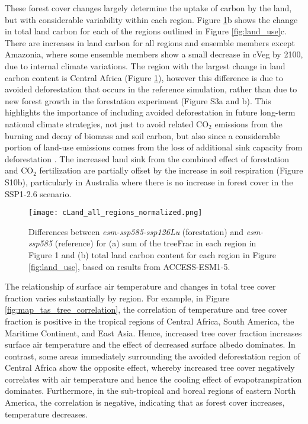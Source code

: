 \documentclass[draft]{agujournal2019}
\begin{document}
These forest cover changes largely determine the uptake of carbon by the land, but with considerable variability within each region.
Figure \ref{fig:accesss_regional_cland}b shows the change in total land carbon for each of the regions outlined in Figure \ref{fig:land_use}c.
There are increases in land carbon for all regions and ensemble members except Amazonia, where some ensemble members show a small decrease in cVeg by 2100, due to internal climate variations.
The region with the largest change in land carbon content is Central Africa (Figure \ref{fig:accesss_regional_cland}), however this difference is due to avoided deforestation that occurs in the reference simulation, rather than due to new forest growth in the forestation experiment (Figure S3a and b).
This highlights the importance of including avoided deforestation in future long-term national climate strategies, not just to avoid related CO$_2$ emissions from the burning and decay of biomass and soil carbon, but also since a considerable portion of land-use emissions comes from the loss of additional sink capacity from deforestation \cite{gitz_amplifying_2003, pongratz_terminology_2014, obermeier_modelled_2021}.
The increased land sink from the combined effect of forestation and CO$_2$ fertilization are partially offset by the increase in soil respiration (Figure S10b), particularly in Australia where there is no increase in forest cover in the SSP1-2.6 scenario.

\begin{figure}
    \texttt{[image: cLand\_all\_regions\_normalized.png]}
    \caption{Differences between \textit{esm-ssp585-ssp126Lu} (forestation) and \textit{esm-ssp585} (reference) for (a) sum of the treeFrac in each region in Figure 1 and (b) total land carbon content for each region in Figure \ref{fig:land_use}, based on results from ACCESS-ESM1-5.}
    \label{fig:accesss_regional_cland}
\end{figure}

The relationship of surface air temperature and changes in total tree cover fraction varies substantially by region.
For example, in Figure \ref{fig:map_tas_tree_correlation}, the correlation of temperature and tree cover fraction is positive in the tropical regions of Central Africa, South America, the Maritime Continent, and East Asia.
Hence, increased tree cover fraction increases surface air temperature and the effect of decreased surface albedo dominates.
In contrast, some areas immediately surrounding the avoided deforestation region of Central Africa show the opposite effect, whereby increased tree cover negatively correlates with air temperature and hence the cooling effect of evapotranspiration dominates.
Furthermore, in the sub-tropical and boreal regions of eastern North America, the correlation is negative, indicating that as forest cover increases, temperature decreases.
\end{document}

